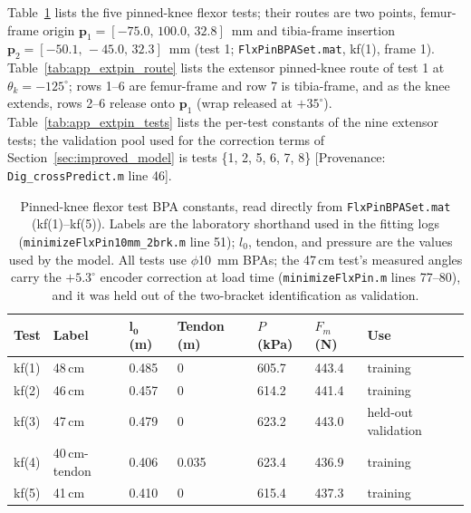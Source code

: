 Table~\ref{tab:app_flxpin_tests} lists the five pinned-knee flexor tests; their routes are two points, femur-frame origin $\mathbf{p}_{1} = [-75.0,\,100.0,\,32.8]$~mm and tibia-frame insertion $\mathbf{p}_{2} = [-50.1,\,-45.0,\,32.3]$~mm (test 1; \texttt{FlxPinBPASet.mat}, kf(1), frame 1). Table~\ref{tab:app_extpin_route} lists the extensor pinned-knee route of test 1 at $\theta_{k}=-125^{\circ}$; rows 1--6 are femur-frame and row 7 is tibia-frame, and as the knee extends, rows 2--6 release onto $\mathbf{p}_{1}$ (wrap released at $+35^{\circ}$). Table~\ref{tab:app_extpin_tests} lists the per-test constants of the nine extensor tests; the validation pool used for the correction terms of Section~\ref{sec:improved_model} is tests \{1, 2, 5, 6, 7, 8\} [Provenance: \texttt{Dig\_crossPredict.m} line 46].

\begin{table}[htbp]
\caption{Pinned-knee flexor test BPA constants, read directly from \texttt{FlxPinBPASet.mat} (kf(1)--kf(5)). Labels are the laboratory shorthand used in the fitting logs (\texttt{minimizeFlxPin10mm\_2brk.m} line 51); $l_{0}$, tendon, and pressure are the values used by the model. All tests use $\phi$\qty{10}{\mm} BPAs; the 47\,cm test's measured angles carry the $+5.3^{\circ}$ encoder correction at load time (\texttt{minimizeFlxPin.m} lines 77--80), and it was held out of the two-bracket identification as validation.}
\label{tab:app_flxpin_tests}
\begin{tabular}{@{}lllllll@{}}
\toprule
\textbf{Test} & \textbf{Label} & $\boldsymbol{l_{0}}$ (m) & Tendon (m) & $P$ (kPa) & $F_{m}$ (N) & \textbf{Use} \\
\midrule
kf(1) & 48\,cm         & 0.485 & 0     & 605.7 & 443.4 & training \\
kf(2) & 46\,cm         & 0.457 & 0     & 614.2 & 441.4 & training \\
kf(3) & 47\,cm         & 0.479 & 0     & 623.2 & 443.0 & held-out validation \\
kf(4) & 40\,cm-tendon  & 0.406 & 0.035 & 623.4 & 436.9 & training \\
kf(5) & 41\,cm         & 0.410 & 0     & 615.4 & 437.3 & training \\
\bottomrule
\end{tabular}
\end{table}

